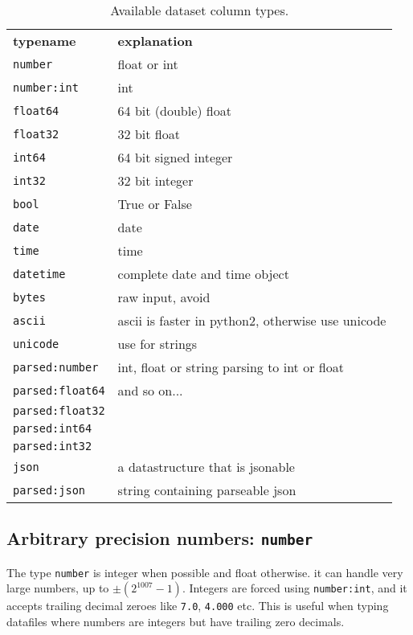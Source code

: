 \begin{table}[h!]
 \begin{tabular*}{\textwidth}{l @{\extracolsep{\fill}} l}
  \hline
   \textbf{typename}   & \textbf{explanation} \\
   \texttt{number}     &  float or int\\
   \texttt{number:int} &  int\\
   \texttt{float64}   &  64 bit (double) float\\
   \texttt{float32}   &  32 bit float\\
   \texttt{int64}     &  64 bit signed integer\\
   \texttt{int32}     &  32 bit integer\\
   \texttt{bool}      &  True or False\\
   \texttt{date}      &  date\\
   \texttt{time}      &  time\\
   \texttt{datetime}  &  complete date and time object\\
   \texttt{bytes}     &  raw input, avoid \\
   \texttt{ascii}     &  ascii is faster in python2, otherwise use unicode\\
   \texttt{unicode}   &  use for strings\\
   \texttt{parsed:number}   & int, float or string parsing to int or float \\
   \texttt{parsed:float64}  &  and so on...\\
   \texttt{parsed:float32}  &  \\
   \texttt{parsed:int64}    &  \\
   \texttt{parsed:int32}    &  \\
   \texttt{json}            &  a datastructure that is jsonable\\
   \texttt{parsed:json}     &  string containing parseable json\\
   \hline
 \end{tabular*}
 \caption{Available dataset column types.}
 \label{tab:types}
\end{table}


\subsection{Arbitrary precision numbers:  \texttt{number}}
The type \texttt{number} is integer when possible and float otherwise.
it can handle very large numbers, up to $\pm (2^{1007}-1)$.  Integers
are forced using \texttt{number:int}, and it accepts trailing decimal
zeroes like \texttt{7.0}, \texttt{4.000} etc.  This is useful when
typing datafiles where numbers are integers but have trailing zero
decimals.

